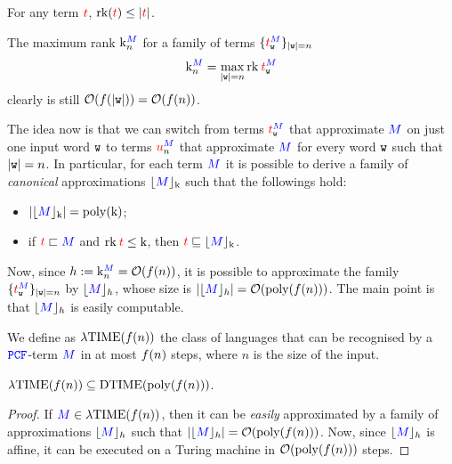 \documentclass{article}
\begin{document}
	\begin{proposition}
		For any term $\tm$, $\rk(\tm)\leq\size{\tm}$.
	\end{proposition}
	The maximum rank $\mrk^{\Tm}_n$ for a family of terms $\{\tm_{\wo}^{\Tm}\}_{\size{\wo}=n}$
	\[
	\mrk^{\Tm}_n=\max_{\size{\wo}=n}\rk\:\tm^{\Tm}_{\wo}
	\]
	clearly is still $\bigo(\fun(\size{\wo}))=\bigo(\fun(n))$.
	
	The idea now is that we can switch from terms $\tm_{\wo}^{\Tm}$ that approximate $\Tm$ on just one input word $\wo$ to terms $\tmtwo_{n}^{\Tm}$ that approximate $\Tm$ for every word $\wo$ such that $\size\wo=n$. In particular, for each term $\Tm$ it is possible to derive a family of \emph{canonical} approximations $\appfam{\Tm}{\mrk}$ such that the followings hold:
	\begin{itemize}
		\item $\size{\appfam{\Tm}{\mrk}}=\poly(\mrk)$;
		\item if $\tm\appr\Tm$ and $\rk\:\tm\leq\mrk$, then $\tm\appraff\appfam{\Tm}{\mrk}$.
	\end{itemize}
	Now, since $h:=\mrk^{\Tm}_n=\bigo(\fun(n))$, it is possible to approximate the family $\{\tm_{\wo}^{\Tm}\}_{\size{\wo}=n}$ by $\appfam{\Tm}{h}$, whose size is $\size{\appfam{\Tm}{h}}=\bigo(\poly(\fun(n)))$. The main point is that $\appfam{\Tm}{h}$ is easily computable.
	\begin{definition}
		We define as $\ltime(\fun(n))$ the class of languages that can be recognised by a $\pcf$-term $\Tm$ in at most $\fun(n)$ steps, where $n$ is the size of the input.
	\end{definition}
	\begin{theorem}
		$\ltime(\fun(n))\subseteq\dtime(\poly(\fun(n)))$.
	\end{theorem}
	\begin{proof}
		If $\Tm\in\ltime(\fun(n))$, then it can be \emph{easily} approximated by a family of approximations $\appfam{\Tm}{h}$ such that $\size{\appfam{\Tm}{h}}=\bigo(\poly(\fun(n)))$. Now, since $\appfam{\Tm}{h}$ is affine, it can be executed on a Turing machine in $\bigo(\poly(\fun(n)))$ steps.
	\end{proof}
	
	
	
\end{document}
